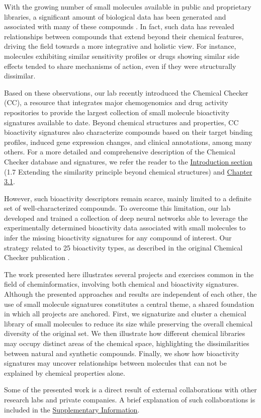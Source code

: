 With the growing number of small molecules available in public and proprietary libraries, a significant amount of biological data has been generated and associated with many of these compounds \cite{zdrazil_chembl_2024, kim_pubchem_2023}. In fact, such data has revealed relationships between compounds that extend beyond their chemical features, driving the field towards a more integrative and holistic view. For instance, molecules exhibiting similar sensitivity profiles or drugs showing similar side effects tended to share mechanisms of action, even if they were structurally dissimilar\cite{campillos_drug_2008}.

Based on these observations, our lab recently introduced the Chemical Checker (CC), a resource that integrates major chemogenomics and drug activity repositories to provide the largest collection of small molecule bioactivity signatures available to date. Beyond chemical structures and properties, CC bioactivity signatures also characterize compounds based on their target binding profiles, induced gene expression changes, and clinical annotations, among many others. For a more detailed and comprehensive description of the Chemical Checker database and signatures, we refer the reader to the \hyperref[Introduction_extending]{Introduction section} (1.7 Extending the similarity principle beyond chemical structures) and \hyperref[Chapter_3.1]{Chapter 3.1}. 

However, such bioactivity descriptors remain scarce, mainly limited to a definite set of well-characterized compounds. To overcome this limitation, our lab developed and trained a collection of deep neural networks able to leverage the experimentally determined bioactivity data associated with small molecules to infer the missing bioactivity signatures for any compound of interest\cite{bertoni_bioactivity_2021}. Our strategy related to 25 bioactivity types, as described in the original Chemical Checker publication \cite{duran-frigola_extending_2020}.

The work presented here illustrates several projects and exercises common in the field of cheminformatics, involving both chemical and bioactivity signatures. Although the presented approaches and results are independent of each other, the use of small molecule signatures constitutes a central theme, a shared foundation in which all projects are anchored. First, we signaturize and cluster a chemical library of small molecules to reduce its size while preserving the overall chemical diversity of the original set. We then illustrate how different chemical libraries may occupy distinct areas of the chemical space, highlighting the dissimilarities between natural and synthetic compounds. Finally, we show how bioactivity signatures may uncover relationships between molecules that can not be explained by chemical properties alone. 

Some of the presented work is a direct result of external collaborations with other research labs and private companies. A brief explanation of such collaborations is included in the \hyperref[Navigation_SupplementaryInformation]{Supplementary Information}. 




